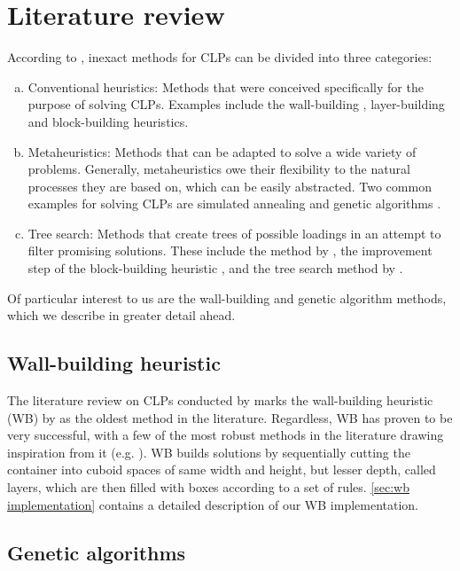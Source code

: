 \section{Literature review}

According to \textcite{FANSLAU2010}, inexact methods for CLPs can be divided into three categories:

\begin{enumerate}[(a)]
    \item Conventional heuristics: Methods that were conceived specifically for the purpose of solving CLPs. Examples include the wall-building \cite{GEORGE1980}, layer-building \cite{BISCHOFF1995} and block-building \cite{ELEY2002} heuristics.
    \item Metaheuristics: Methods that can be adapted to solve a wide variety of problems. Generally, metaheuristics owe their flexibility to the natural processes they are based on, which can be easily abstracted. Two common examples for solving CLPs are simulated annealing \cite{EGEBLAD2009} and genetic algorithms \cite{GONÇALVES2011}.
    \item Tree search: Methods that create trees of possible loadings in an attempt to filter promising solutions. These include the method by \textcite{FANSLAU2010}, the improvement step of the block-building heuristic \cite{ELEY2002}, and the tree search method by \textcite{LIU2014}.
\end{enumerate}

Of particular interest to us are the wall-building and genetic algorithm methods, which we describe in greater detail ahead.

\subsection{Wall-building heuristic}

The literature review on CLPs conducted by \textcite{BORTFELDT2012} marks the wall-building heuristic (WB) by \textcite{GEORGE1980} as the oldest method in the literature. Regardless, WB has proven to be very successful, with a few of the most robust methods in the literature drawing inspiration from it (e.g. \cite{EGEBLAD2010}). WB builds solutions by sequentially cutting the container into cuboid spaces of same width and height, but lesser depth, called layers, which are then filled with boxes according to a set of rules. \cref{sec:wb implementation} contains a detailed description of our WB implementation.

\subsection{Genetic algorithms}

